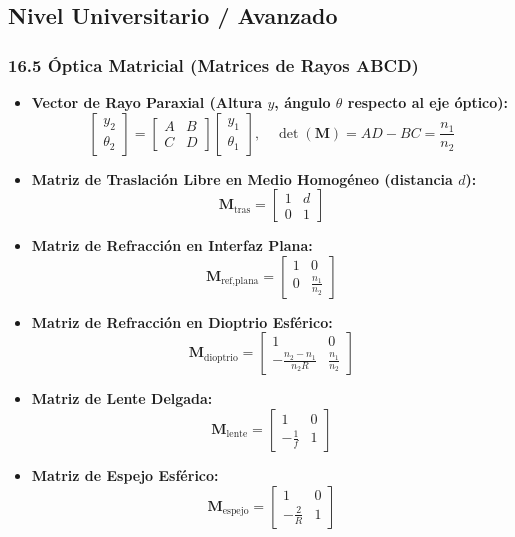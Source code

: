 \documentclass[11pt,a4paper]{article}
\begin{document}
\subsection*{Nivel Universitario / Avanzado}

\subsubsection*{16.5 Óptica Matricial (Matrices de Rayos ABCD)}

\begin{itemize}
  \item \textbf{Vector de Rayo Paraxial (Altura $y$, ángulo $\theta$ respecto al eje óptico):}
  \[
    \begin{bmatrix} y_2 \\ \theta_2 \end{bmatrix} = \begin{bmatrix} A & B \\ C & D \end{bmatrix} \begin{bmatrix} y_1 \\ \theta_1 \end{bmatrix}, \quad \det\left( \mathbf{M} \right) = AD - BC = \frac{n_1}{n_2}
  \]
  \item \textbf{Matriz de Traslación Libre en Medio Homogéneo (distancia $d$):}
  \[
    \mathbf{M}_{\text{tras}} = \begin{bmatrix} 1 & d \\ 0 & 1 \end{bmatrix}
  \]
  \item \textbf{Matriz de Refracción en Interfaz Plana:}
  \[
    \mathbf{M}_{\text{ref,plana}} = \begin{bmatrix} 1 & 0 \\ 0 & \frac{n_1}{n_2} \end{bmatrix}
  \]
  \item \textbf{Matriz de Refracción en Dioptrio Esférico:}
  \[
    \mathbf{M}_{\text{dioptrio}} = \begin{bmatrix} 1 & 0 \\ -\frac{n_2 - n_1}{n_2 R} & \frac{n_1}{n_2} \end{bmatrix}
  \]
  \item \textbf{Matriz de Lente Delgada:}
  \[
    \mathbf{M}_{\text{lente}} = \begin{bmatrix} 1 & 0 \\ -\frac{1}{f} & 1 \end{bmatrix}
  \]
  \item \textbf{Matriz de Espejo Esférico:}
  \[
    \mathbf{M}_{\text{espejo}} = \begin{bmatrix} 1 & 0 \\ -\frac{2}{R} & 1 \end{bmatrix}
  \]
\end{itemize}
\end{document}
